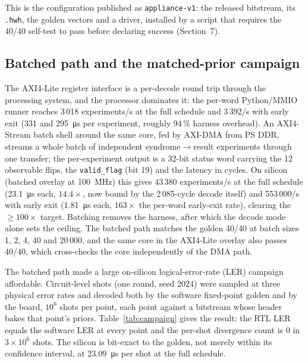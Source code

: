 This is the configuration published as \texttt{appliance-v1}: the released
bitstream, its \texttt{.hwh}, the golden vectors and a driver, installed by a
script that requires the 40/40 self-test to pass before declaring success
(Section~7).

\subsection*{Batched path and the matched-prior campaign}

The AXI4-Lite register interface is a per-decode round trip through the
processing system, and the processor dominates it: the per-word Python/MMIO
runner reaches 3\,018 experiments/s at the full schedule and 3\,392/s with
early exit (331 and \SI{295}{\micro\second} per experiment, roughly
94\,\% harness overhead). An AXI4-Stream batch shell around the same core,
fed by AXI-DMA from PS DDR, streams a whole batch of independent
syndrome$\rightarrow$result experiments through one transfer; the per-experiment
output is a 32-bit status word carrying the 12 observable flips, the
\texttt{valid\_flag} (bit 19) and the latency in cycles.
On silicon (batched overlay at \SI{100}{\MHz}) this gives 43\,380
experiments/s at the full schedule (\SI{23.1}{\micro\second} each, $14.4\times$,
now bound by the 2\,085-cycle decode itself) and 553\,000/s with early exit
(\SI{1.81}{\micro\second} each, $163\times$ the per-word early-exit rate),
clearing the $\geq 100\times$ target. Batching removes the harness, after
which the decode mode alone sets the ceiling.
The batched path matches the golden 40/40 at batch sizes 1, 2, 4, 40 and
20\,000, and the same core in the AXI4-Lite overlay also passes 40/40, which
cross-checks the core independently of the DMA path.

The batched path made a large on-silicon logical-error-rate (LER) campaign
affordable. Circuit-level shots (one round, seed 2024) were sampled at three
physical error rates and decoded both by the software fixed-point golden and
by the board, $10^{6}$ shots per point, each point against a bitstream whose
header bakes that point's priors. Table~\ref{tab:campaign} gives the result:
the RTL LER equals the software LER at every point and the per-shot
divergence count is 0 in $3\times10^{6}$ shots. The silicon is bit-exact to
the golden, not merely within its confidence interval, at
\SI{23.09}{\micro\second} per shot at the full schedule.

